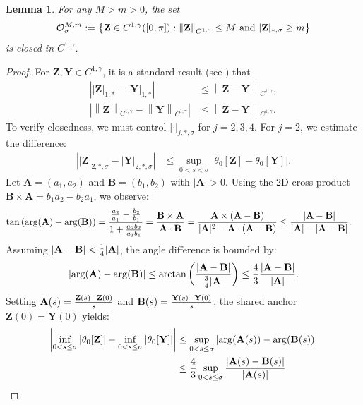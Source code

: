 \documentclass{amsart}
\newcommand{\mA}{\mathbf{A}}
\newcommand{\mB}{\mathbf{B}}
\newcommand{\mZ}{\mathbf{Z}}
\newcommand{\mY}{\mathbf{Y}}
\newtheorem{lemma}[theorem]{Lemma}
\begin{document}
\begin{lemma}\label{lem:O_closed}
For any $M > m > 0$, the set 
$$
\mathcal{O}^{M,m}_\sigma:= \left\{ \mZ \in C^{1,\gamma}([0,\pi]): \left\| \mZ \right\|_{C^{1,\gamma}} \leq M \hbox{ and } |\mZ|_{*,\sigma} \geq m\right\}
$$
is closed in $C^{1,\gamma}$.  
\end{lemma}
\begin{proof}
For $\mZ, \mY \in C^{1,\gamma}$, it is a standard result (see \cite{mori2019well}) that 
\begin{align*}
\left| |\mZ|_{1,*} - |\mY|_{1,*} \right| & \leq \left\| \mZ - \mY \right\|_{C^{1,\gamma}}, \\
\left| \left\| \mZ \right\|_{C^{1,\gamma}}  - \left\|  \mY \right\|_{C^{1,\gamma}}  \right| & \leq \left\| \mZ - \mY \right\|_{C^{1,\gamma}}.
\end{align*}
To verify closedness, we must control $|\cdot|_{j,*,\sigma}$ for $j=2,3,4$. For $j=2$, we estimate the difference:
\begin{align*}
\left| |\mZ|_{2,*,\sigma} - |\mY|_{2,*,\sigma}\right|
& \leq  \sup_{0 < s < \sigma} \left| \theta_0[\mZ] - \theta_0[\mY] \right|.
\end{align*}
Let $\mA = (a_1,a_2)$ and $\mB = (b_1,b_2)$ with $|\mA| > 0$. Using the 2D cross product $\mB \times \mA = b_1 a_2 - b_2 a_1$, we observe:
\begin{align*}
\tan \left( \arg( \mA ) - \arg( \mB ) \right)
& = { {a_2\over a_1} - {b_2 \over b_1} \over 1 + { a_2 b_2 \over a_1 b_1}} 
 =  { \mB \times \mA \over \mA \cdot \mB}  
 =  { \mA \times (\mA - \mB) \over |\mA|^2 - \mA \cdot (\mA - \mB)}  
\leq {|\mA - \mB| \over |\mA| - |\mA - \mB|}.
\end{align*}
Assuming $|\mA -\mB| < {1\over 4} |\mA|$, the angle difference is bounded by:
\begin{align*}
\left| \arg( \mA) - \arg(\mB) \right| 
 \leq \arctan \left( {|\mA - \mB| \over {3\over4} |\mA|} \right)  \leq {4 \over 3}  { \left| \mA - \mB \right| \over |\mA|}.
\end{align*}
Setting $\mA(s) = {\mZ(s)-\mZ(0)\over s} $ and $\mB(s) = {\mY(s)-\mY(0) \over s} $, the shared anchor $\mZ(0) = \mY(0)$ yields:
\begin{align*}
\left| \inf_{0< s\leq \sigma} \left| \theta_0[\mZ] \right| - \inf_{0< s\leq \sigma} \left| \theta_0[\mY] \right|  \right|
& \leq \sup_{0< s  \leq \sigma} \left| \arg(\mA(s)) - \arg(\mB(s)) \right| \\
& \leq {4\over 3} \sup_{0< s  \leq \sigma} { \left| \mA(s) - \mB (s) \right| \over |\mA(s) | } \\

\end{align*}
\end{proof}
\end{document}
